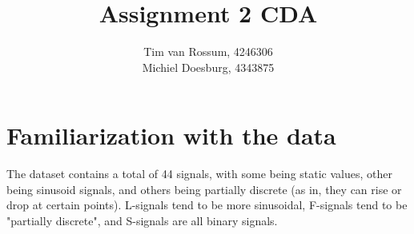 \documentclass[]{article}
\title{Assignment 2 CDA}
\author{Tim van Rossum, 4246306\\
	Michiel Doesburg, 4343875}
\begin{document}
\maketitle
\section{Familiarization with the data}
The dataset contains a total of 44 signals, with some being static values, other being sinusoid signals, and others being partially discrete (as in, they can rise or drop at certain points). L-signals tend to be more sinusoidal, F-signals tend to be "partially discrete", and S-signals are all binary signals.
\end{document}
